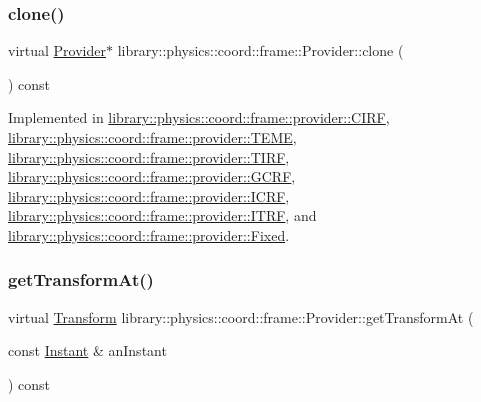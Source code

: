 \subsubsection{\texorpdfstring{clone()}{clone()}}
{\footnotesize\ttfamily virtual \hyperlink{classlibrary_1_1physics_1_1coord_1_1frame_1_1_provider}{Provider}$\ast$ library\+::physics\+::coord\+::frame\+::\+Provider\+::clone (\begin{DoxyParamCaption}{ }\end{DoxyParamCaption}) const\hspace{0.3cm}{\ttfamily [pure virtual]}}



Implemented in \hyperlink{classlibrary_1_1physics_1_1coord_1_1frame_1_1provider_1_1_c_i_r_f_af75424e9e3a86a5aa06f998a8710c5c2}{library\+::physics\+::coord\+::frame\+::provider\+::\+C\+I\+RF}, \hyperlink{classlibrary_1_1physics_1_1coord_1_1frame_1_1provider_1_1_t_e_m_e_a606d0c4cad7df776e848fd3670e5cc7f}{library\+::physics\+::coord\+::frame\+::provider\+::\+T\+E\+ME}, \hyperlink{classlibrary_1_1physics_1_1coord_1_1frame_1_1provider_1_1_t_i_r_f_a48ef3f686e9bcc744a5e3d1fa1779ab6}{library\+::physics\+::coord\+::frame\+::provider\+::\+T\+I\+RF}, \hyperlink{classlibrary_1_1physics_1_1coord_1_1frame_1_1provider_1_1_g_c_r_f_ae32853b62bfe251fd48262b7ab383fc7}{library\+::physics\+::coord\+::frame\+::provider\+::\+G\+C\+RF}, \hyperlink{classlibrary_1_1physics_1_1coord_1_1frame_1_1provider_1_1_i_c_r_f_a06ce5c7c4bc22045d612d951cbeb4d14}{library\+::physics\+::coord\+::frame\+::provider\+::\+I\+C\+RF}, \hyperlink{classlibrary_1_1physics_1_1coord_1_1frame_1_1provider_1_1_i_t_r_f_a0408f17419e49f785863ba7a84865857}{library\+::physics\+::coord\+::frame\+::provider\+::\+I\+T\+RF}, and \hyperlink{classlibrary_1_1physics_1_1coord_1_1frame_1_1provider_1_1_fixed_aa042b90216dd5276ffca2054c93dfc6e}{library\+::physics\+::coord\+::frame\+::provider\+::\+Fixed}.

\mbox{\label{classlibrary_1_1physics_1_1coord_1_1frame_1_1_provider_a796fd2dd337f1304a0e9acf573ce2550}} 
\subsubsection{\texorpdfstring{get\+Transform\+At()}{getTransformAt()}}
{\footnotesize\ttfamily virtual \hyperlink{classlibrary_1_1physics_1_1coord_1_1_transform}{Transform} library\+::physics\+::coord\+::frame\+::\+Provider\+::get\+Transform\+At (\begin{DoxyParamCaption}\item[{const \hyperlink{classlibrary_1_1physics_1_1time_1_1_instant}{Instant} \&}]{an\+Instant }\end{DoxyParamCaption}) const\hspace{0.3cm}{\ttfamily [pure virtual]}}



